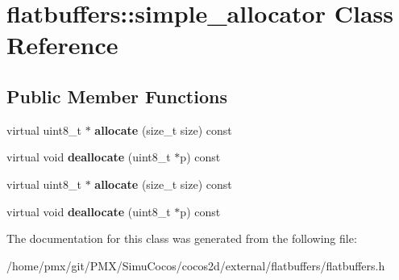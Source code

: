 \hypertarget{classflatbuffers_1_1simple__allocator}{}\section{flatbuffers\+:\+:simple\+\_\+allocator Class Reference}
\label{classflatbuffers_1_1simple__allocator}
\subsection*{Public Member Functions}
\begin{DoxyCompactItemize}
\item 
\mbox{\label{classflatbuffers_1_1simple__allocator_a44bc2233dd94d9915d44d73d70ffe9b6}} 
virtual uint8\+\_\+t $\ast$ {\bfseries allocate} (size\+\_\+t size) const
\item 
\mbox{\label{classflatbuffers_1_1simple__allocator_a126245c5f4c14b0f8ba32534a31e8514}} 
virtual void {\bfseries deallocate} (uint8\+\_\+t $\ast$p) const
\item 
\mbox{\label{classflatbuffers_1_1simple__allocator_a44bc2233dd94d9915d44d73d70ffe9b6}} 
virtual uint8\+\_\+t $\ast$ {\bfseries allocate} (size\+\_\+t size) const
\item 
\mbox{\label{classflatbuffers_1_1simple__allocator_a126245c5f4c14b0f8ba32534a31e8514}} 
virtual void {\bfseries deallocate} (uint8\+\_\+t $\ast$p) const
\end{DoxyCompactItemize}


The documentation for this class was generated from the following file\+:\begin{DoxyCompactItemize}
\item 
/home/pmx/git/\+P\+M\+X/\+Simu\+Cocos/cocos2d/external/flatbuffers/flatbuffers.\+h\end{DoxyCompactItemize}
